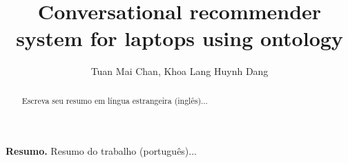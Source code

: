 \documentclass[12pt,a4paper]{article}
\begin{document}
\title{Conversational recommender system for laptops using ontology\\[10pt] } 
\author{Tuan Mai Chan, Khoa Lang Huynh Dang \\[6pt]}


\maketitle

\begin{abstract}
Escreva seu resumo em língua estrangeira (inglês)...
\end{abstract}

\textbf{Resumo.} Resumo do trabalho (português)...







\printbibliography
\end{document}
